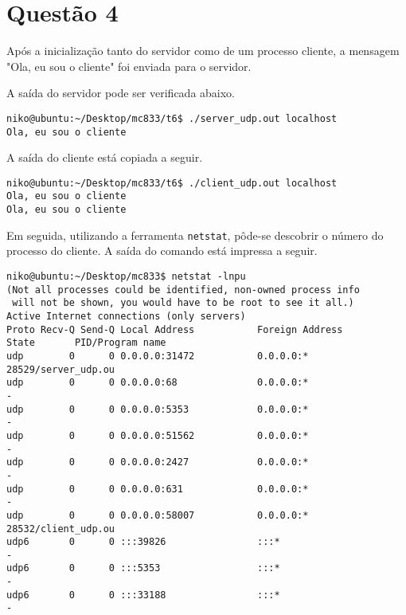 \documentclass[a4paper,10pt]{article}
\begin{document}
\section{Questão 4}

Após a inicialização tanto do servidor como de um processo cliente, a mensagem "Ola, eu sou o cliente" foi enviada para o servidor.

A saída do servidor pode ser verificada abaixo.

\begin{lstlisting}
niko@ubuntu:~/Desktop/mc833/t6$ ./server_udp.out localhost
Ola, eu sou o cliente

\end{lstlisting}

A saída do cliente está copiada a seguir.

\begin{lstlisting}
niko@ubuntu:~/Desktop/mc833/t6$ ./client_udp.out localhost
Ola, eu sou o cliente
Ola, eu sou o cliente

\end{lstlisting}

Em seguida, utilizando a ferramenta {\tt netstat}, pôde-se descobrir o número do processo do cliente. A saída do comando está impressa a seguir.

\begin{lstlisting}
niko@ubuntu:~/Desktop/mc833$ netstat -lnpu
(Not all processes could be identified, non-owned process info
 will not be shown, you would have to be root to see it all.)
Active Internet connections (only servers)
Proto Recv-Q Send-Q Local Address           Foreign Address         State       PID/Program name
udp        0      0 0.0.0.0:31472           0.0.0.0:*                           28529/server_udp.ou
udp        0      0 0.0.0.0:68              0.0.0.0:*                           -               
udp        0      0 0.0.0.0:5353            0.0.0.0:*                           -               
udp        0      0 0.0.0.0:51562           0.0.0.0:*                           -               
udp        0      0 0.0.0.0:2427            0.0.0.0:*                           -               
udp        0      0 0.0.0.0:631             0.0.0.0:*                           -               
udp        0      0 0.0.0.0:58007           0.0.0.0:*                           28532/client_udp.ou
udp6       0      0 :::39826                :::*                                -               
udp6       0      0 :::5353                 :::*                                -               
udp6       0      0 :::33188                :::*                                -               

\end{lstlisting}
\end{document}
